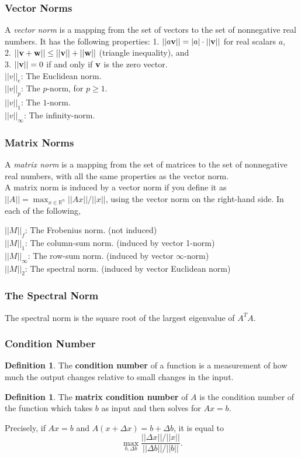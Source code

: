 \documentclass[12pt]{beamer}
\newcommand{\RR}{\ensuremath{\mathbb{R}}}
\theoremstyle{definition}
\newtheorem{defn}[thm]{Definition}
\begin{document}
\begin{frame}
\frametitle{Vector Norms}
A {\em vector norm} is a mapping from the set of vectors
to the set of nonnegative real numbers. It has the following
properties: 1. $||a {\bf v}|| = |a|\cdot ||{\bf v}||$ for real scalars $a$, \\
2. $||{\bf v} + {\bf w}|| \leq 
||{\bf v}|| + ||{\bf w}||$ (triangle inequality), and \\
3. $||{\bf v}||=0$ if and only
if ${\bf v}$ is the zero vector. \\[5mm]

$||v||_e$: The Euclidean norm. \\
$||v||_p$: The $p$-norm, for $p \geq 1$. \\
$||v||_1$: The $1$-norm. \\
$||v||_\infty$: The infinity-norm.\\

\end{frame}


\begin{frame}
\frametitle{Matrix Norms}
A {\em matrix norm} is a mapping from the set of matrices
to the set of nonnegative real numbers, with all the same
properties as the vector norm.\\[5mm]

A matrix norm is induced by a vector norm if you define it as 
$||A|| = \max_{x\in \RR^n} ||Ax||/||x||$, using the 
vector norm on the right-hand side. In each of the following,


$||M||_f$: The Frobenius norm. (not induced) \\
$||M||_1$: The column-sum norm. (induced by vector 1-norm) \\
$||M||_\infty$: The row-sum norm. (induced by vector $\infty$-norm) \\
$||M||_2$: The spectral norm. (induced by vector Euclidean norm)\\
\end{frame}

\begin{frame}
\frametitle{The Spectral Norm}

The spectral norm is the square root of the
largest eigenvalue of $A^TA$.
\end{frame}

\begin{frame}
\frametitle{Condition Number}

\begin{defn}
The {\bf condition number} of a function is a
measurement of how much the output changes relative
to small changes in the input.


\end{defn}

\begin{defn}
The {\bf matrix condition number} of $A$  is the condition number
of the function which takes $b$ as input and then solves for
$Ax = b$.

Precisely, if $Ax = b$ and $A(x+ \Delta x) = b + \Delta b$, it is equal to
\[
\max_{b, \Delta b} \dfrac{|| \Delta x ||/|| x|| }{|| \Delta b||/ ||b||}.
\]
\end{defn}


\end{frame}
\end{document}
